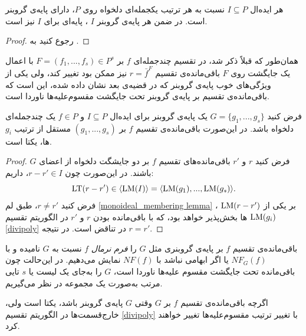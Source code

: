 \begin{theorem}
	\label{grobner existence th}
هر ایده‌‌‌ال
$I\subseteq P$
نسبت به هر ترتیب یکجمله‌ای دلخواه روی 
$P$،
دارای پایه‌ی گروبنر است. در ضمن هر پایه‌ی گروبنر
$I$
، پایه‌ای برای 
$I$
نیز است. 
\end{theorem}
\begin{proof}
	رجوع کنید به 
{\small \cite{IVAcox}}.
\end{proof}

همان‌طور که قبلاً ذکر شد، در تقسیم چندجمله‌ای 
$f$
بر 
$F = (f_{1},...,f_{s})\in P^{s}$
با اعمال یک جایگشت روی 
$F$
باقی‌مانده‌ی تقسیم 
$r = \bar{f}^{F}$
نیز ممکن بود تغییر کند، ولی یکی از ویژگی‌های خوب پایه‌ی گروبنر که در قضیه‌ی بعد نشان داده شده، این است که باقی‌مانده‌ی تقسیم بر پایه‌ی گروبنر تحت جایگشت مقسوم‌علیه‌ها ناوردا است. 

\begin{theorem}
فرض کنید 
{\small $G = \{g_{1},...,g_{s}\}$}
یک پایه‌ی گروبنر برای ایده‌ال 
$I\subseteq P$
و 
$f\in P$
یک چندجمله‌ای دلخواه باشد. در این‌صورت باقی‌مانده‌ی تقسیم 
$f$
بر 
$(g_{1},...,g_{s})$
مستقل از ترتیب 
$g_{i}$
ها، یکتا است. 
\end{theorem}
\begin{proof}
فرض کنید 
$r$
و
$r'$
باقی‌مانده‌های تقسیم 
$f$
بر دو جایشگت دلخواه از اعضای 
$G$
باشند. در این‌صورت چون 
$r - r'\in I$،
داریم:
$$\operatorname{\mathrm{LT}}(r - r')\in\langle \operatorname{\mathrm{LM}}(I)\rangle = \langle\operatorname{\mathrm{LM}}(g_{1}),...,\operatorname{\mathrm{LM}}(g_{s})\rangle.$$
فرض کنید 
$r\neq r'$،
طبق لم 
\ref{monoideal_membering lemma}
، 
$\operatorname{\mathrm{LM}}(r - r')$
بر یکی از 
$\operatorname{\mathrm{LM}}(g_{i})$
ها بخش‌پذیر خواهد بود، که با باقی‌مانده بودن 
$r$
و
$r'$
در الگوریتم تقسیم 
\ref{divipoly}
در تناقض است. در نتیجه 
$r = r'$.
\end{proof}
باقی‌مانده‌ی تقسیم 
$f$
بر پایه‌ی گروبنری مثل 
$G$
را 
\textit{فرم نرمال}
$f$
نسبت به 
$G$
نامیده و با 
$NF_{G}(f)$
یا اگر ابهامی نباشد با 
$NF(f)$
نمایش می‌دهیم. در این‌حالت چون باقی‌مانده تحت جایگشت مقسوم علیه‌ها ناوردا است، 
$G$
را به‌جای یک لیست یا 
$s$
تایی مرتب به‌صورت یک مجموعه در نظر می‌گیریم.
\begin{remark}
اگر‌چه باقی‌مانده‌ی تقسیم 
$f$
بر 
$G$
وقتی 
$G$
پایه‌ی گروبنر باشد، یکتا است ولی، خارج‌‌قسمت‌ها در الگوریتم تقسیم 
\ref{divipoly}
با تغییر ترتیب مقسوم‌علیه‌ها تغییر خواهند کرد.
\end{remark}

